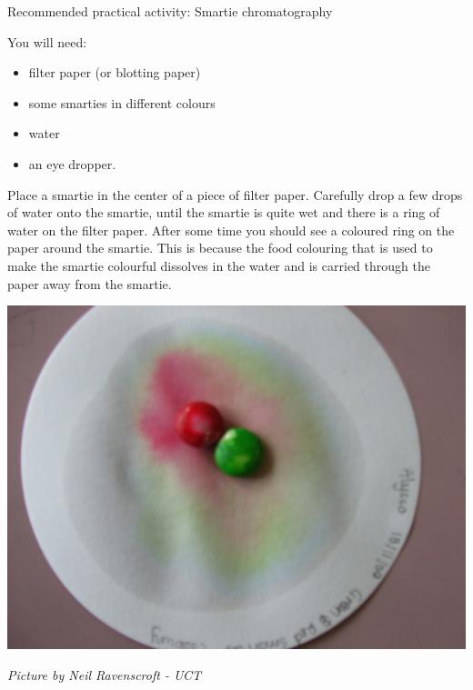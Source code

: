 \begin{activity}{Recommended practical activity: Smartie chromatography}{
You will need:
\begin{itemize}[noitemsep]
\item filter paper (or blotting paper)
\item some smarties in different colours
\item water
\item an eye dropper.
\end{itemize}
\begin{minipage}{.5\textwidth}
Place a smartie in the center of a piece of filter paper. Carefully drop a few drops of water onto the smartie, until the smartie is quite wet and there is a ring of water on the filter paper. After some time you should see a coloured ring on the paper around the smartie. This is because the food colouring that is used to make the smartie colourful dissolves in the water and is carried through the paper away from the smartie. 
\end{minipage}
\begin{minipage}{.5\textwidth}
\begin{center}
 \includegraphics[width=.8\textwidth]{photos/smartie2.jpg}\par
\textit{Picture by Neil Ravenscroft - UCT}
\end{center}
\end{minipage}
}
\end{activity}
\par 
	\par
      \label{m38708*uid25}
